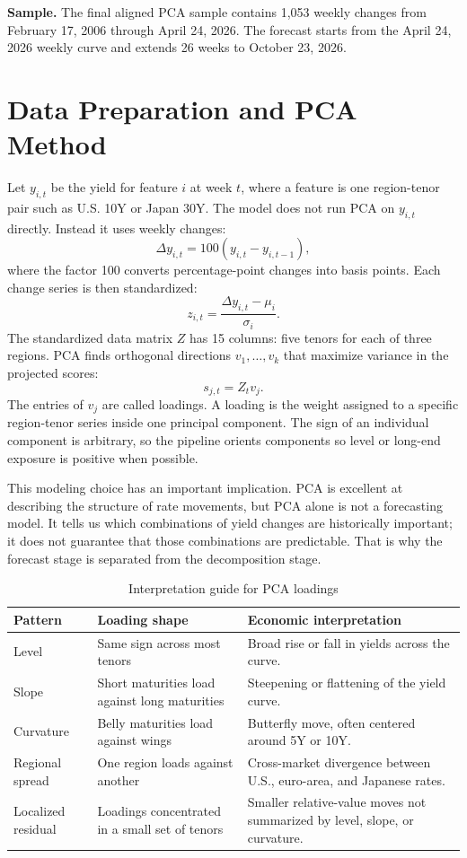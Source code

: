 \documentclass[11pt]{article}
\begin{document}
\textbf{Sample.} The final aligned PCA sample contains 1,053 weekly changes from February 17, 2006 through April 24, 2026. The forecast starts from the April 24, 2026 weekly curve and extends 26 weeks to October 23, 2026.

\clearpage

\section{Data Preparation and PCA Method}

Let $y_{i,t}$ be the yield for feature $i$ at week $t$, where a feature is one region-tenor pair such as U.S. 10Y or Japan 30Y. The model does not run PCA on $y_{i,t}$ directly. Instead it uses weekly changes:
\[
\Delta y_{i,t}=100(y_{i,t}-y_{i,t-1}),
\]
where the factor 100 converts percentage-point changes into basis points. Each change series is then standardized:
\[
z_{i,t}=\frac{\Delta y_{i,t}-\mu_i}{\sigma_i}.
\]
The standardized data matrix $Z$ has 15 columns: five tenors for each of three regions. PCA finds orthogonal directions $v_1,\ldots,v_k$ that maximize variance in the projected scores:
\[
s_{j,t}=Z_t v_j.
\]
The entries of $v_j$ are called loadings. A loading is the weight assigned to a specific region-tenor series inside one principal component. The sign of an individual component is arbitrary, so the pipeline orients components so level or long-end exposure is positive when possible.

This modeling choice has an important implication. PCA is excellent at describing the structure of rate movements, but PCA alone is not a forecasting model. It tells us which combinations of yield changes are historically important; it does not guarantee that those combinations are predictable. That is why the forecast stage is separated from the decomposition stage.

\begin{table}[htbp]
\centering
\caption{Interpretation guide for PCA loadings}
\small
\begin{tabular}{p{1.25in}p{2.45in}p{2.55in}}
\toprule
Pattern & Loading shape & Economic interpretation \\
\midrule
Level & Same sign across most tenors & Broad rise or fall in yields across the curve. \\
Slope & Short maturities load against long maturities & Steepening or flattening of the yield curve. \\
Curvature & Belly maturities load against wings & Butterfly move, often centered around 5Y or 10Y. \\
Regional spread & One region loads against another & Cross-market divergence between U.S., euro-area, and Japanese rates. \\
Localized residual & Loadings concentrated in a small set of tenors & Smaller relative-value moves not summarized by level, slope, or curvature. \\
\bottomrule
\end{tabular}
\end{table}
\end{document}
